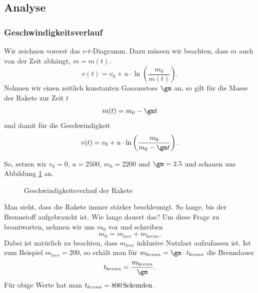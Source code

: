 \documentclass[%
11pt,%
twoside,%
titlepage,%
german,%
headsepline%
]{scrartcl}
\begin{document}
\subsection{Analyse}
\subsubsection{Geschwindigkeitsverlauf}

Wir zeichnen vorerst das $v$-$t$-Diagramm. Dazu m\"ussen wir beachten, dass $m$ auch von der Zeit abh\"angt, $m=m(t)$.
$$v(t)=v_0+u\cdot\ln\left(\frac{m_0}{m(t)}\right).$$
Nehmen wir einen zeitlich konstanten Gasausstoss $\gm$ an, so gilt f\"ur die Masse der Rakete zur Zeit $t$
$$m(t)=m_0-\gm t$$
und damit f\"ur die Geschwindigkeit
$$v(t)=v_0+u\cdot\ln\left(\frac{m_0}{m_0-\gm t}\right).$$

So, setzen wir $v_0=0$, $u=2500$, $m_0=2200$ und $\gm=2.5$ und schauen uns Abbildung \ref{geschwindigkeitrakete} an.

\begin{figure}
\begin{center}
\end{center}
\caption{Geschwindigkeitsverlauf der Rakete}\label{geschwindigkeitrakete}
\end{figure}


Man sieht, dass die Rakete immer st\"arker beschleunigt. So lange, bis der Brennstoff aufgebraucht ist. Wie lange dauert das? Um diese Frage zu beantworten, nehmen wir uns $m_0$ vor und schreiben
$$m_0=m_{leer}+m_{brenn}.$$
Dabei ist nat\"urlich zu beachten, dass $m_{leer}$ inklusive Nutzlast aufzufassen ist. Ist zum Beispiel $m_{leer}=200$, so erh\"alt man f\"ur $m_{brenn}=\gm\cdot t_{brenn}$ die Brenndauer
$$t_{brenn}=\frac{m_{brenn}}{\gm}.$$
F\"ur obige Werte hat man $t_{brenn}=\unit[800]{Sekunden}$.
\end{document}
